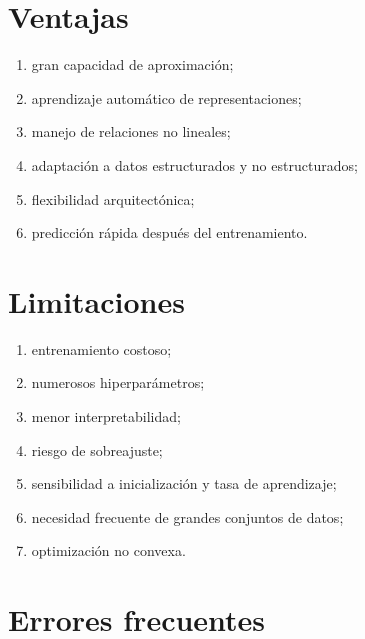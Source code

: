 \documentclass[
  spanish,
  10.5pt,
  letterpaper,
  DIV=11,
  numbers=noendperiod,
  oneside,
  open=any]{scrreprt}
\providecommand{\tightlist}{%
  \setlength{\itemsep}{0pt}\setlength{\parskip}{0pt}}
\theoremstyle{definition}
\theoremstyle{definition}
\theoremstyle{plain}
\theoremstyle{remark}
\begin{document}
\section*{Ventajas}\label{ventajas-3}


\begin{enumerate}
\def\labelenumi{\arabic{enumi}.}
\tightlist
\item
  gran capacidad de aproximación;
\item
  aprendizaje automático de representaciones;
\item
  manejo de relaciones no lineales;
\item
  adaptación a datos estructurados y no estructurados;
\item
  flexibilidad arquitectónica;
\item
  predicción rápida después del entrenamiento.
\end{enumerate}

\section*{Limitaciones}\label{limitaciones-3}


\begin{enumerate}
\def\labelenumi{\arabic{enumi}.}
\tightlist
\item
  entrenamiento costoso;
\item
  numerosos hiperparámetros;
\item
  menor interpretabilidad;
\item
  riesgo de sobreajuste;
\item
  sensibilidad a inicialización y tasa de aprendizaje;
\item
  necesidad frecuente de grandes conjuntos de datos;
\item
  optimización no convexa.
\end{enumerate}

\section*{Errores frecuentes}\label{errores-frecuentes-14}

\end{document}
